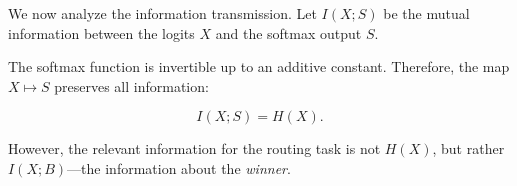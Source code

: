 We now analyze the information transmission. Let $I(X; S)$ be the mutual information between the logits $X$ and the softmax output $S$.













\begin{lemma}






\label{lem:mutual}






The softmax function is invertible up to an additive constant. Therefore, the map $X \mapsto S$ preserves all information:






\[






I(X; S) = H(X).






\]






\end{lemma}













However, the relevant information for the routing task is not $H(X)$, but rather $I(X; B)$—the information about the \textit{winner}.













